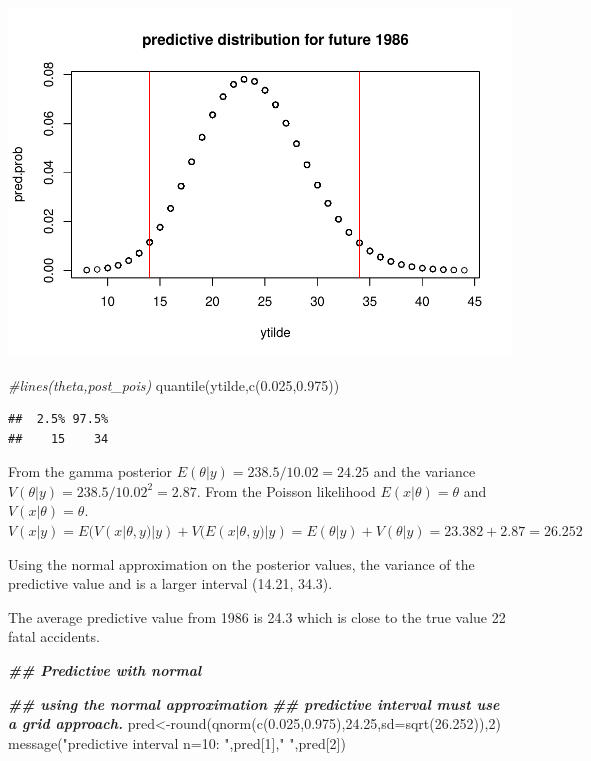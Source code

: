 \documentclass[
]{book}
\newenvironment{Shaded}{\begin{snugshade}}{\end{snugshade}}
\newcommand{\AttributeTok}[1]{\textcolor[rgb]{0.77,0.63,0.00}{#1}}
\newcommand{\CommentTok}[1]{\textcolor[rgb]{0.56,0.35,0.01}{\textit{#1}}}
\newcommand{\DecValTok}[1]{\textcolor[rgb]{0.00,0.00,0.81}{#1}}
\newcommand{\DocumentationTok}[1]{\textcolor[rgb]{0.56,0.35,0.01}{\textbf{\textit{#1}}}}
\newcommand{\FloatTok}[1]{\textcolor[rgb]{0.00,0.00,0.81}{#1}}
\newcommand{\FunctionTok}[1]{\textcolor[rgb]{0.00,0.00,0.00}{#1}}
\newcommand{\NormalTok}[1]{#1}
\newcommand{\OtherTok}[1]{\textcolor[rgb]{0.56,0.35,0.01}{#1}}
\newcommand{\StringTok}[1]{\textcolor[rgb]{0.31,0.60,0.02}{#1}}
\theoremstyle{definition}
\theoremstyle{definition}
\theoremstyle{definition}
\theoremstyle{definition}
\theoremstyle{remark}
\begin{document}
\includegraphics{_main_files/figure-latex/unnamed-chunk-23-2.pdf}

\begin{Shaded}
\begin{Highlighting}[]
 \CommentTok{\#lines(theta,post\_pois)}
 \FunctionTok{quantile}\NormalTok{(ytilde,}\FunctionTok{c}\NormalTok{(}\FloatTok{0.025}\NormalTok{,}\FloatTok{0.975}\NormalTok{))}
\end{Highlighting}
\end{Shaded}

\begin{verbatim}
##  2.5% 97.5% 
##    15    34
\end{verbatim}

From the gamma posterior \(E(\theta | y) = 238.5/10.02=24.25\) and the variance \(V(\theta|y)= 238.5/10.02^2=2.87\). From the Poisson likelihood \(E(x|\theta)=\theta\) and \(V(x|\theta)=\theta\). \(V(x|y)= E(V(x|\theta,y) | y) + V(E(x|\theta,y)|y)= E(\theta| y)+ V(\theta|y) = 23.382+2.87= 26.252\)

Using the normal approximation on the posterior values, the variance of the predictive value and is a larger interval (14.21, 34.3).

The average predictive value from 1986 is 24.3 which is close to the true value 22 fatal accidents.

\begin{Shaded}
\begin{Highlighting}[]
  \DocumentationTok{\#\# Predictive with normal}

\DocumentationTok{\#\# using the normal approximation}
\DocumentationTok{\#\# predictive interval must use a grid approach.}
\NormalTok{     pred}\OtherTok{\textless{}{-}}\FunctionTok{round}\NormalTok{(}\FunctionTok{qnorm}\NormalTok{(}\FunctionTok{c}\NormalTok{(}\FloatTok{0.025}\NormalTok{,}\FloatTok{0.975}\NormalTok{),}\FloatTok{24.25}\NormalTok{,}\AttributeTok{sd=}\FunctionTok{sqrt}\NormalTok{(}\FloatTok{26.252}\NormalTok{)),}\DecValTok{2}\NormalTok{)}
  \FunctionTok{message}\NormalTok{(}\StringTok{"predictive interval n=10: "}\NormalTok{,pred[}\DecValTok{1}\NormalTok{],}\StringTok{" "}\NormalTok{,pred[}\DecValTok{2}\NormalTok{])}
\end{Highlighting}
\end{Shaded}
\end{document}
